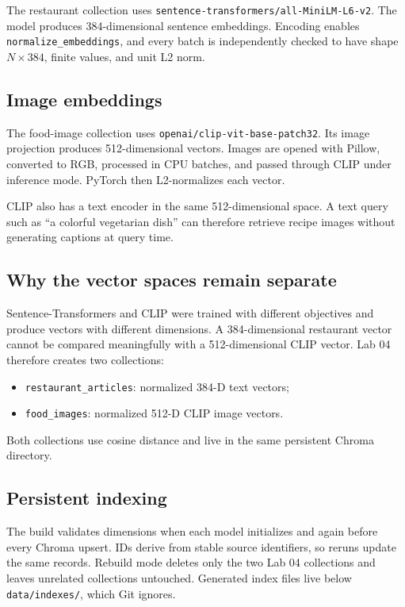 \documentclass[11pt]{article}
\begin{document}
The restaurant collection uses
\texttt{sentence-transformers/all-MiniLM-L6-v2}. The model produces
384-dimensional sentence embeddings. Encoding enables
\texttt{normalize\_embeddings}, and every batch is independently checked to
have shape \(N \times 384\), finite values, and unit L2 norm.

\subsection{Image embeddings}

The food-image collection uses
\texttt{openai/clip-vit-base-patch32}. Its image projection produces
512-dimensional vectors. Images are opened with Pillow, converted to RGB,
processed in CPU batches, and passed through CLIP under inference mode. PyTorch
then L2-normalizes each vector.

CLIP also has a text encoder in the same 512-dimensional space. A text query
such as ``a colorful vegetarian dish'' can therefore retrieve recipe images
without generating captions at query time.

\subsection{Why the vector spaces remain separate}

Sentence-Transformers and CLIP were trained with different objectives and
produce vectors with different dimensions. A 384-dimensional restaurant vector
cannot be compared meaningfully with a 512-dimensional CLIP vector. Lab 04
therefore creates two collections:

\begin{itemize}
  \item \texttt{restaurant\_articles}: normalized 384-D text vectors;
  \item \texttt{food\_images}: normalized 512-D CLIP image vectors.
\end{itemize}

Both collections use cosine distance and live in the same persistent Chroma
directory.

\subsection{Persistent indexing}

The build validates dimensions when each model initializes and again before
every Chroma upsert. IDs derive from stable source identifiers, so reruns update
the same records. Rebuild mode deletes only the two Lab 04 collections and
leaves unrelated collections untouched. Generated index files live below
\texttt{data/indexes/}, which Git ignores.
\end{document}
